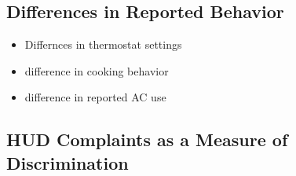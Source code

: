\documentclass{article}
\begin{document}
  \subsection{Differences in Reported Behavior}
  
  \begin{itemize}
    \item Differnces in thermostat settings
    \item difference in cooking behavior
    \item difference in reported AC use

  \end{itemize}
  
  
  \subsection{HUD Complaints as a Measure of Discrimination}
  
\end{document}
